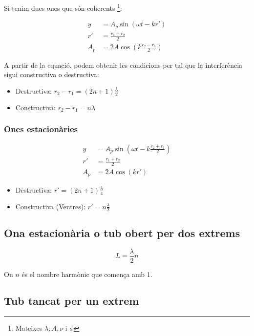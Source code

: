Si tenim dues ones que són coherents \footnote{Mateixes $\lambda,A,\nu$ i $\phi$}:

\begin{align}
    y &= A_p\sin\left( \omega t -k r' \right) \\
    r' &= \frac{r_1+r_2}{2} \\
    A_p &= 2A\cos\left( k \frac{r_2-r_1}{2} \right)
\end{align}

A partir de la equació, podem obtenir les condicions per tal que la
interferència sigui constructiva o destructiva:

\begin{itemize}
    \item Destructiva: $r_2-r_1 = (2n+1)\frac{\lambda}{2}$
    \item Constructiva: $r_2 -r_1 = n\lambda$
\end{itemize}

\subsubsection{Ones estacionàries}
\label{ssub:ones_estacionaries}

\begin{align}
    y &= A_p\sin\left( \omega t -k \frac{r_2+r_1}{2} \right) \\
    r' &= \frac{r_1+r_2}{2} \\
    A_p &= 2A\cos\left( kr' \right)
\end{align}

\begin{itemize}
    \item Destructiva: $r' = (2n+1)\frac{\lambda}{4}$
    \item Constructiva (Ventres): $r' = n\frac{\lambda}{2}$
\end{itemize}

\subsection{Ona estacionària o tub obert per dos extrems}
\label{sub:ona_estacionaria_o_tub_obert_per_dos_extrems}

\begin{equation}
    L = \frac{\lambda}{2}n
\end{equation}

On $n$ és el nombre harmònic que comença amb 1.

\subsection{Tub tancat per un extrem}
\label{sub:tub_tancat_per_un_extrem}

